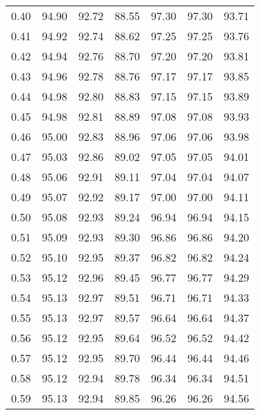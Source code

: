 \begin{tabular}{|c|c|c|c|c|c|c|}
      0.40 &     94.90 &     92.72 &      88.55 &   97.30 &      97.30 &         93.71 \\
      0.41 &     94.92 &     92.74 &      88.62 &   97.25 &      97.25 &         93.76 \\
      0.42 &     94.94 &     92.76 &      88.70 &   97.20 &      97.20 &         93.81 \\
      0.43 &     94.96 &     92.78 &      88.76 &   97.17 &      97.17 &         93.85 \\
      0.44 &     94.98 &     92.80 &      88.83 &   97.15 &      97.15 &         93.89 \\
      0.45 &     94.98 &     92.81 &      88.89 &   97.08 &      97.08 &         93.93 \\
      0.46 &     95.00 &     92.83 &      88.96 &   97.06 &      97.06 &         93.98 \\
      0.47 &     95.03 &     92.86 &      89.02 &   97.05 &      97.05 &         94.01 \\
      0.48 &     95.06 &     92.91 &      89.11 &   97.04 &      97.04 &         94.07 \\
      0.49 &     95.07 &     92.92 &      89.17 &   97.00 &      97.00 &         94.11 \\
      0.50 &     95.08 &     92.93 &      89.24 &   96.94 &      96.94 &         94.15 \\
      0.51 &     95.09 &     92.93 &      89.30 &   96.86 &      96.86 &         94.20 \\
      0.52 &     95.10 &     92.95 &      89.37 &   96.82 &      96.82 &         94.24 \\
      0.53 &     95.12 &     92.96 &      89.45 &   96.77 &      96.77 &         94.29 \\
      0.54 &     95.13 &     92.97 &      89.51 &   96.71 &      96.71 &         94.33 \\
      0.55 &     95.13 &     92.97 &      89.57 &   96.64 &      96.64 &         94.37 \\
      0.56 &     95.12 &     92.95 &      89.64 &   96.52 &      96.52 &         94.42 \\
      0.57 &     95.12 &     92.95 &      89.70 &   96.44 &      96.44 &         94.46 \\
      0.58 &     95.12 &     92.94 &      89.78 &   96.34 &      96.34 &         94.51 \\
      0.59 &     95.13 &     92.94 &      89.85 &   96.26 &      96.26 &         94.56 \\

\end{tabular}
